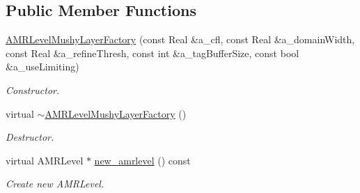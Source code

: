 \subsection*{Public Member Functions}
\begin{DoxyCompactItemize}
\item 
\hyperlink{class_a_m_r_level_mushy_layer_factory_af5500c64b1b300e8c11211aa617ff792}{A\-M\-R\-Level\-Mushy\-Layer\-Factory} (const Real \&a\-\_\-cfl, const Real \&a\-\_\-domain\-Width, const Real \&a\-\_\-refine\-Thresh, const int \&a\-\_\-tag\-Buffer\-Size, const bool \&a\-\_\-use\-Limiting)
\begin{DoxyCompactList}\small\item\em Constructor. \end{DoxyCompactList}\item 
\hypertarget{class_a_m_r_level_mushy_layer_factory_af574fd628470ed342ad0687f055924f1}{virtual \hyperlink{class_a_m_r_level_mushy_layer_factory_af574fd628470ed342ad0687f055924f1}{$\sim$\-A\-M\-R\-Level\-Mushy\-Layer\-Factory} ()}\label{class_a_m_r_level_mushy_layer_factory_af574fd628470ed342ad0687f055924f1}

\begin{DoxyCompactList}\small\item\em Destructor. \end{DoxyCompactList}\item 
\hypertarget{class_a_m_r_level_mushy_layer_factory_abf0a09d3816249031b1d583b74120355}{virtual A\-M\-R\-Level $\ast$ \hyperlink{class_a_m_r_level_mushy_layer_factory_abf0a09d3816249031b1d583b74120355}{new\-\_\-amrlevel} () const }\label{class_a_m_r_level_mushy_layer_factory_abf0a09d3816249031b1d583b74120355}

\begin{DoxyCompactList}\small\item\em Create new A\-M\-R\-Level. \end{DoxyCompactList}\end{DoxyCompactItemize}
